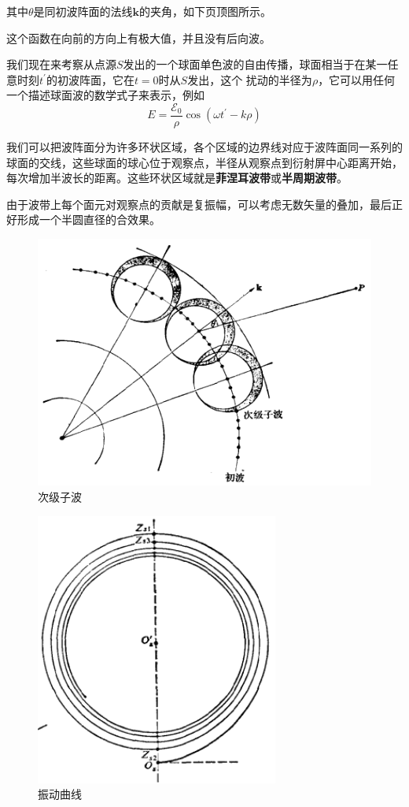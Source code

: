\documentclass[UTF8]{ctexart}
\begin{document}
\noindent 其中$ \theta $是同初波阵面的法线$ \mathbf{k} $的夹角，如下页顶图所示。

\noindent 这个函数在向前的方向上有极大值，并且没有后向波。

	我们现在来考察从点源$ S $发出的一个球面单色波的自由传播，球面相当于在某一任意时刻$ t^{\prime} $的初波阵面，它在$ t=0 $时从$ S $发出，这个 扰动的半径为$ \rho $，它可以用任何一个描述球面波的数学式子来表示，例如
	\begin{equation}
	E=\frac{\mathscr{E}_{0}}{\rho} \cos \left(\omega t^{\prime}-k \rho\right)
	\end{equation}
	
	我们可以把波阵面分为许多环状区域，各个区域的边界线对应于波阵面同一系列的球面的交线，这些球面的球心位于观察点，半径从观察点到衍射屏中心距离开始，每次增加半波长的距离。这些环状区域就是\textbf{菲涅耳波带}或\textbf{半周期波带}。
	
	由于波带上每个面元对观察点的贡献是复振幅，可以考虑无数矢量的叠加，最后正好形成一个半圆直径的合效果。
	
	\newpage
	\begin{figure}[htp]
		\centering
		\includegraphics[width=12cm]{Diffraction_fei.png}
		\caption{次级子波}
		\label{figure_fei}
	\end{figure}

	\begin{figure}[ht]
		\centering
		\includegraphics[width=8cm]{Diffraction_zhendong.png}
		\caption{振动曲线}
		\label{figure_zhendong}
	\end{figure}
\end{document}
